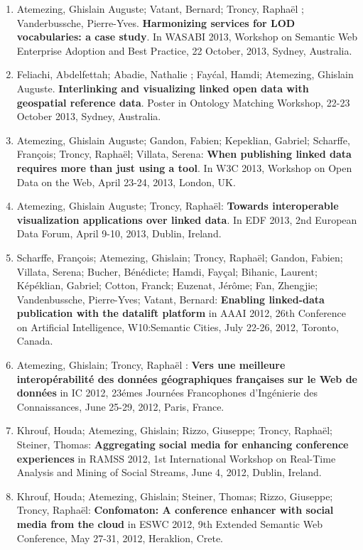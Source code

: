 \begin{enumerate}
\item Atemezing, Ghislain Auguste; Vatant, Bernard; Troncy, Rapha{\"e}l ; Vanderbussche, Pierre-Yves. \textbf{Harmonizing services for LOD vocabularies: a case study}. In WASABI 2013, Workshop on Semantic Web Enterprise Adoption and Best Practice, 22 October, 2013, Sydney, Australia.

\item Feliachi, Abdelfettah; Abadie, Nathalie ; Fay{\'c}al, Hamdi; Atemezing, Ghislain Auguste. \textbf{{I}nterlinking and visualizing linked open data with geospatial reference data}. Poster in Ontology Matching Workshop, 22-23 October 2013, Sydney, Australia.

\item Atemezing, Ghislain Auguste; Gandon, Fabien; Kepeklian, Gabriel; Scharffe, Fran\c{c}ois; Troncy, Rapha{\"e}l; Villata, Serena: 
\textbf{When publishing linked data requires more than just using a tool}. In 
W3C 2013, Workshop on Open Data on the Web, April 23-24, 2013, London, UK.

\item Atemezing, Ghislain Auguste; Troncy,  Rapha{\"e}l: \textbf{
Towards interoperable visualization applications over linked data}. In 
EDF 2013, 2nd European Data Forum, April 9-10, 2013, Dublin, Ireland.


\item Scharffe, Fran\c cois; Atemezing, Ghislain; Troncy, Rapha\"{e}l; Gandon, Fabien; Villata, Serena; Bucher, B\'{e}n\'{e}dicte; Hamdi, Fay\c cal; Bihanic, Laurent; K\'{e}p\'{e}klian, Gabriel; Cotton, Franck; Euzenat, J\'{e}r\^{o}me; Fan, Zhengjie; Vandenbussche, Pierre-Yves; Vatant, Bernard: \textbf{Enabling linked-data publication with the datalift platform} in
AAAI 2012, 26th Conference on Artificial Intelligence, W10:Semantic Cities, July 22-26, 2012, Toronto, Canada.


\item Atemezing, Ghislain; Troncy, Rapha\"{e}l : \textbf{Vers une meilleure interop\'{e}rabilit\'{e} des donn\'{e}es g\'{e}ographiques fran\c caises sur le Web de donn\'{e}es} in IC 2012, 23\'{e}mes Journ\'{e}es Francophones d'Ing\'{e}nierie des Connaissances, June 25-29, 2012, Paris, France.

\item Khrouf, Houda; Atemezing, Ghislain; Rizzo, Giuseppe; Troncy, Rapha\"{e}l; Steiner, Thomas:
\textbf{Aggregating social media for enhancing conference experiences} in RAMSS 2012, 1st International Workshop on Real-Time Analysis and Mining of Social Streams, June 4, 2012, Dublin, Ireland.

\item Khrouf, Houda; Atemezing, Ghislain; Steiner, Thomas; Rizzo, Giuseppe; Troncy, Rapha\"{e}l: 
\textbf{Confomaton: A conference enhancer with social media from the cloud} in ESWC 2012, 9th Extended Semantic Web Conference, May 27-31, 2012, Heraklion, Crete.


\end{enumerate}

